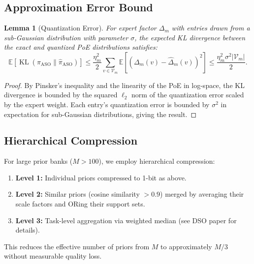 \documentclass[11pt]{article}
\newtheorem{lemma}[theorem]{Lemma}
\DeclareMathOperator{\KL}{KL}
\begin{document}
\subsection{Approximation Error Bound}

\begin{lemma}[Quantization Error]
\label{lem:quant-error}
For expert factor $\Delta_m$ with entries drawn from a sub-Gaussian distribution
with parameter $\sigma$, the expected KL divergence between the exact and
quantized PoE distributions satisfies:
\begin{equation}
    \mathbb{E}\left[\KL\left(\pi_{\text{ASO}} \| \hat{\pi}_{\text{ASO}}\right)\right]
    \leq \frac{\eta_m^2}{2} \sum_{v \in \mathcal{V}_m}
    \mathbb{E}\left[(\Delta_m(v) - \widehat{\Delta}_m(v))^2\right]
    \leq \frac{\eta_m^2 \sigma^2 |\mathcal{V}_m|}{2}.
\end{equation}
\end{lemma}

\begin{proof}
By Pinsker's inequality and the linearity of the PoE in log-space, the KL
divergence is bounded by the squared $\ell_2$ norm of the quantization error
scaled by the expert weight. Each entry's quantization error is bounded by
$\sigma^2$ in expectation for sub-Gaussian distributions, giving the result.
\end{proof}

\subsection{Hierarchical Compression}

For large prior banks ($M > 100$), we employ hierarchical compression:
\begin{enumerate}[leftmargin=1.5em]
    \item \textbf{Level 1:} Individual priors compressed to 1-bit as above.
    \item \textbf{Level 2:} Similar priors (cosine similarity $> 0.9$) merged
          by averaging their scale factors and ORing their support sets.
    \item \textbf{Level 3:} Task-level aggregation via weighted median
          (see DSO paper for details).
\end{enumerate}

This reduces the effective number of priors from $M$ to approximately
$M / 3$ without measurable quality loss.

\end{document}
